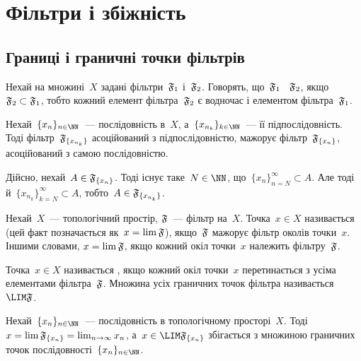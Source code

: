 \chapter{Фільтри і збіжність}

\section{Границі і граничні точки фільтрів}

\begin{definition}
    Нехай на множині~$X$ задані фільтри~$\frak F_1$ і~$\frak F_2$. Говорять, що~$\frak F_1$ ~$\frak F_2$, якщо~$\frak F_2 \subset \frak F_1$, тобто кожний елемент фільтра~$\frak F_2$ є водночас і елементом фільтра~$\frak F_1$.
\end{definition}

\begin{example}
    Нехай~$\{x_n\}_{n \in \NN}$~--- послідовність в~$X$, а~$\{x_{n_k}\}_{k \in \NN}$~--- її підпослідовність. Тоді фільтр~$\frak F_{\{x_{n_k}\}}$ асоційований з підпослідовністю, мажорує фільтр~$\frak F_{\{x_n\}}$, асоційований з самою послідовністю. 
    
    Дійсно, нехай~$A \in \frak F_{\{x_n\}}$. Тоді існує таке~$N \in \NN$, що~$\{x_n\}_{n = N}^\infty \subset A$. Але тоді й~$\{x_{n_k}\}_{k = N}^\infty \subset A$, тобто~$A \in \frak F_{\{x_{n_k}\}}$.
\end{example}

\begin{definition}
    Нехай~$X$~--- топологічний простір, $\frak F$~--- фільтр на~$X$. Точка~$x \in X$ називається  (цей факт позначається як~$x = \lim \frak F$), якщо~$\frak F$ мажорує фільтр околів точки~$x$. Іншими словами, $x = \lim \frak F$, якщо кожний окіл точки~$x$ належить фільтру~$\frak F$.
\end{definition}

\begin{definition}
    Точка~$x \in X$ називається , якщо кожний окіл точки~$x$ перетинається з усіма елементами фільтра~$\frak F$. Множина усіх граничних точок фільтра називається~$\LIM \frak F$.
\end{definition}

\begin{example}
    Нехай~$\{x_n\}_{n \in \NN}$~--- послідовність в топологічному просторі~$X$. Тоді~$x = \lim \frak F_{\{x_n\}} = \lim_{ n \to \infty} x_n$, а~$x \in \LIM \frak F_{\{x_n\}}$ збігається з множиною граничних точок послідовності~$\{x_n\}_{n \in \NN}$.
\end{example}

